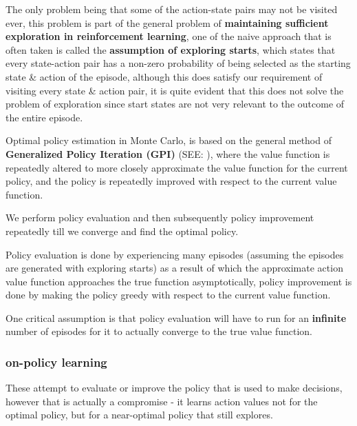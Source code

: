 The only problem being that some of the action-state pairs may not be visited ever, this problem is part of the general problem of \textbf{maintaining sufficient exploration in reinforcement learning}, one of the naive approach that is often taken is called the \textbf{assumption of exploring starts}, which states that every state-action pair has a non-zero probability of being selected as the starting state \& action of the episode, although this does satisfy our requirement of visiting every state \& action pair, it is quite evident that this does not solve the problem of exploration since start states are not very relevant to the outcome of the entire episode.

Optimal policy estimation in Monte Carlo, is based on the general method of \textbf{Generalized Policy Iteration (GPI)} (SEE: ), where the value function is repeatedly altered to more closely approximate the value function for the current policy, and the policy is repeatedly improved with respect to the current value function.

We perform policy evaluation and then subsequently policy improvement repeatedly till we converge and find the optimal policy.

Policy evaluation is done by experiencing many episodes (assuming the episodes are generated with exploring starts) as a result of which the approximate action value function approaches the true function asymptotically, policy improvement is done by making the policy greedy with respect to the current value function.

One critical assumption is that policy evaluation will have to run for an \textbf{infinite} number of episodes for it to actually converge to the true value function.

\subsubsection{on-policy learning \cite{medium/nerd-for-tech/monte-carlo-methods-for-reinforcement-learning-d30d874dd817}}\label{RL: on-policy learning}

These attempt to evaluate or improve the policy that is used to make decisions, however that is actually a compromise - it learns action values not for the optimal policy, but for a near-optimal policy that still explores.


